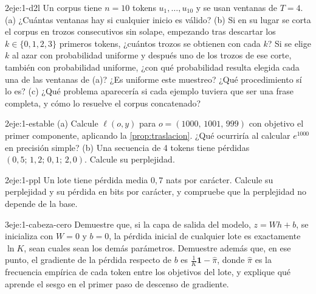 \begin{ejercicio}{2}{eje:1-d2l}
Un corpus tiene $n=10$ tokens $u_1,\dots,u_{10}$ y se usan ventanas de $T=4$. (a) ¿Cuántas ventanas hay si cualquier inicio es válido? (b) Si en su lugar se corta el corpus en trozos consecutivos sin solape, empezando tras descartar los $k\in\{0,1,2,3\}$ primeros tokens, ¿cuántos trozos se obtienen con cada $k$? Si se elige $k$ al azar con probabilidad uniforme y después uno de los trozos de ese corte, también con probabilidad uniforme, ¿con qué probabilidad resulta elegida cada una de las ventanas de (a)? ¿Es uniforme este muestreo? ¿Qué procedimiento sí lo es? (c) ¿Qué problema aparecería si cada ejemplo tuviera que ser una frase completa, y cómo lo resuelve el corpus concatenado?
\end{ejercicio}

\begin{ejercicio}{2}{eje:1-estable}
(a) Calcule $\ell(o,y)$ para $o=(1000,\,1001,\,999)$ con objetivo el primer componente, aplicando la \cref{prop:traslacion}. ¿Qué ocurriría al calcular $e^{1000}$ en precisión simple? (b) Una secuencia de 4 tokens tiene pérdidas $(0{,}5;\allowbreak\,1{,}2;\allowbreak\,0{,}1;\allowbreak\,2{,}0)$. Calcule su perplejidad.
\end{ejercicio}

\begin{ejercicio}{2}{eje:1-ppl}
Un lote tiene pérdida media $0{,}7$ nats por carácter. Calcule su perplejidad y su pérdida en bits por carácter, y compruebe que la perplejidad no depende de la base.
\end{ejercicio}

\begin{ejercicio}{3}{eje:1-cabeza-cero}
Demuestre que, si la capa de salida del modelo, $z=Wh+b$, se inicializa con $W=0$ y $b=0$, la pérdida inicial de cualquier lote es exactamente $\ln K$, sean cuales sean los demás parámetros. Demuestre además que, en ese punto, el gradiente de la pérdida respecto de $b$ es $\tfrac1K\mathbf 1-\hat\pi$, donde $\hat\pi$ es la frecuencia empírica de cada token entre los objetivos del lote, y explique qué aprende el sesgo en el primer paso de descenso de gradiente.
\end{ejercicio}
